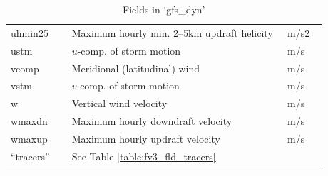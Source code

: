 \documentclass[11pt,fleqn]{report}              %
\begin{document}
\begin{enumerate}
\begin{enumerate}
{\begin{longtable}{ p{0.17\linewidth} | p{0.6\linewidth} | p{0.11\linewidth} }
uhmin25 & Maximum hourly min. 2--5km updraft helicity & m/s2  \\
ustm & $u$-comp. of storm motion  & m/s \\
vcomp & Meridional (latitudinal) wind & m/s \\
vstm & $v$-comp. of storm motion & m/s \\
w & Vertical wind velocity & m/s  \\
wmaxdn & Maximum hourly downdraft velocity & m/s  \\
wmaxup & Maximum hourly updraft velocity & m/s \\
 \hdashline
``tracers'' & See Table \ref{table:fv3_fld_tracers} & \\
 \hline
\caption{Fields in `gfs\_dyn'}
\label{table:fv3_fld_gfs_dyn}
\end{longtable}
}



\end{enumerate}
\end{enumerate}
\end{document}
